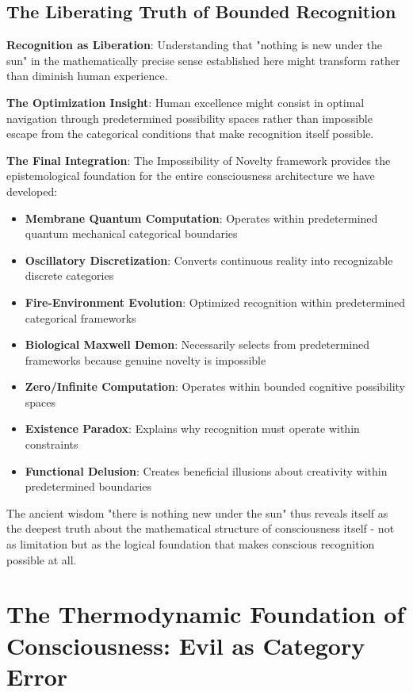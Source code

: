 \documentclass[12pt]{article}
\begin{document}
\subsection{The Liberating Truth of Bounded Recognition}

\textbf{Recognition as Liberation}: Understanding that "nothing is new under the sun" in the mathematically precise sense established here might transform rather than diminish human experience.

\textbf{The Optimization Insight}: Human excellence might consist in optimal navigation through predetermined possibility spaces rather than impossible escape from the categorical conditions that make recognition itself possible.

\textbf{The Final Integration}: The Impossibility of Novelty framework provides the epistemological foundation for the entire consciousness architecture we have developed:
\begin{itemize}
\item \textbf{Membrane Quantum Computation}: Operates within predetermined quantum mechanical categorical boundaries
\item \textbf{Oscillatory Discretization}: Converts continuous reality into recognizable discrete categories
\item \textbf{Fire-Environment Evolution}: Optimized recognition within predetermined categorical frameworks
\item \textbf{Biological Maxwell Demon}: Necessarily selects from predetermined frameworks because genuine novelty is impossible
\item \textbf{Zero/Infinite Computation}: Operates within bounded cognitive possibility spaces
\item \textbf{Existence Paradox}: Explains why recognition must operate within constraints
\item \textbf{Functional Delusion}: Creates beneficial illusions about creativity within predetermined boundaries
\end{itemize}

The ancient wisdom "there is nothing new under the sun" thus reveals itself as the deepest truth about the mathematical structure of consciousness itself - not as limitation but as the logical foundation that makes conscious recognition possible at all.

\section{The Thermodynamic Foundation of Consciousness: Evil as Category Error}
\end{document}
